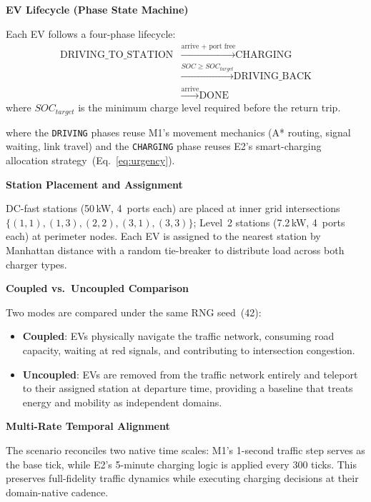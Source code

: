 \medskip\noindent\textbf{EV Lifecycle (Phase State Machine)}

Each EV follows a four-phase lifecycle:
\begin{equation}
\begin{aligned}
\text{DRIVING\_TO\_STATION}
&\xrightarrow{\text{arrive + port free}}
\text{CHARGING} \\
&\xrightarrow{SOC \geq SOC_{target}}
\text{DRIVING\_BACK} \\
&\xrightarrow{\text{arrive}}
\text{DONE}
\end{aligned}
\label{eq:ev_phases}
\end{equation}
where $SOC_{target}$ is the minimum charge level required before the return trip.

where the \texttt{DRIVING} phases reuse M1's movement mechanics (A* routing, signal waiting, link travel) and the \texttt{CHARGING} phase reuses E2's smart-charging allocation strategy~(Eq.~\ref{eq:urgency}).

\medskip\noindent\textbf{Station Placement and Assignment}

DC-fast stations (50\,kW, 4~ports each) are placed at inner grid intersections $\{(1,1),(1,3),(2,2),(3,1),(3,3)\}$; Level~2 stations (7.2\,kW, 4~ports each) at perimeter nodes. Each EV is assigned to the nearest station by Manhattan distance with a random tie-breaker to distribute load across both charger types.

\medskip\noindent\textbf{Coupled vs.\ Uncoupled Comparison}

Two modes are compared under the same RNG seed~(42):
\begin{itemize}
    \item \textbf{Coupled}: EVs physically navigate the traffic network, consuming road capacity, waiting at red signals, and contributing to intersection congestion.
    \item \textbf{Uncoupled}: EVs are removed from the traffic network entirely and teleport to their assigned station at departure time, providing a baseline that treats energy and mobility as independent domains.
\end{itemize}

\medskip\noindent\textbf{Multi-Rate Temporal Alignment}

The scenario reconciles two native time scales: M1's 1-second traffic step serves as the base tick, while E2's 5-minute charging logic is applied every 300 ticks. This preserves full-fidelity traffic dynamics while executing charging decisions at their domain-native cadence.

